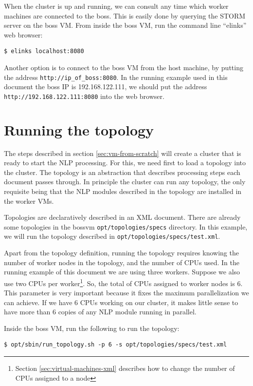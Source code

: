 \documentclass[a4]{article}
\begin{document}
When the cluster is up and running, we can consult any time which worker
machines are connected to the boss. This is easily done by querying the
STORM server on the boss VM. From inside the boss VM, run the command line
``elinks'' web browser:

\begin{verbatim}
$ elinks localhost:8080
\end{verbatim}

Another option is to connect to the boss VM from the host machine, by
putting the address \texttt{http://ip\_of\_boss:8080}. In the running example
used in this document the boss IP is 192.168.122.111, we should put the
address \texttt{http://192.168.122.111:8080} into the web browser.

\section{Running the topology}
\label{sec:running-topology}

The steps described in section \ref{sec:vm-from-scratch} will create a
cluster that is ready to start the NLP processing. For this, we need first
to load a topology into the cluster. The topology is an abstraction that
describes processing steps each document passes through. In principle the
cluster can run any topology, the only requisite being that the NLP modules
described in the topology are installed in the worker VMs.

Topologies are declaratively described in an XML document. There are already
some topologies in the bossvm \texttt{opt/topologies/specs} directory. In
this example, we will run the topology described in
\texttt{opt/topologies/specs/test.xml}. 

Apart from the topology definition, running the topology requires knowing
the number of worker nodes in the topology, and the number of CPUs used. In
the running example of this document we are using three workers. Suppose we
also use two CPUs per worker\footnote{Section \ref{sec:virtual-machines-xml}
  describes how to change the number of CPUs assigned to a node}. So, the
total of CPUs assigned to worker nodes is $6$. This parameter is very
important because it fixes the maximum parallelization we can achieve. If we
have 6 CPUs working on our cluster, it makes little sense to have more than
6 copies of any NLP module running in parallel.

Inside the boss VM, run the following to run the topology:

\begin{verbatim}
$ opt/sbin/run_topology.sh -p 6 -s opt/topologies/specs/test.xml
\end{verbatim}
\end{document}
